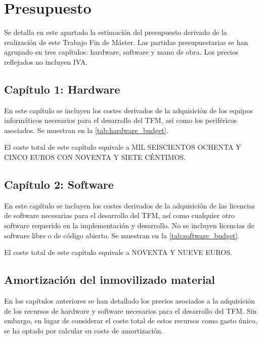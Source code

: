 
\section{Presupuesto} \label{sec:5_presupuesto}
Se detalla en este apartado la estimación del presupuesto derivado de la realización de este Trabajo Fin de Máster.
Las partidas presupuestarias se han agrupado en tres capítulos: hardware, software y mano de obra. Los precios reflejados 
no incluyen IVA.

\subsection{Capítulo 1: Hardware} \label{sec:5_presupuesto_hardware}
En este capítulo se incluyen los costes derivados de la adquisición de los equipos informáticos necesarios 
para el desarrollo del TFM, así como los periféricos asociados. Se muestran en la \autoref{tab:hardware_budget}.



El coste total de este capítulo equivale a MIL SEISCIENTOS OCHENTA Y CINCO EUROS CON NOVENTA Y SIETE CÉNTIMOS.

\newpage

\subsection{Capítulo 2: Software} \label{sec:5_presupuesto_software}
En este capítulo se incluyen los costes derivados de la adquisición de las licencias de software necesarias
para el desarrollo del TFM, así como cualquier otro software requerido en la implementación y desarrollo. No 
se incluyen licencias de software libre o de código abierto. Se muestran en la \autoref{tab:software_budget}.



El coste total de este capítulo equivale a NOVENTA Y NUEVE EUROS.

\subsection{Amortización del inmovilizado material} \label{sec:5_presupuesto_amortizacion}
En los capítulos anteriores se han detallado los precios asociados a la adquisición de los recursos de hardware y 
software necesarios para el desarrollo del TFM. Sin embargo, en lugar de considerar el coste total de estos recursos 
como gasto único, se ha optado por calcular su coste de amortización.

